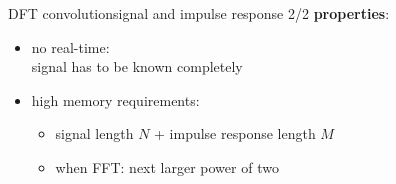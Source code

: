 	\begin{frame}{DFT convolution}{signal and impulse response 2/2}
		\textbf{properties}:
		\begin{itemize}
			\item	no real-time:\\ signal has to be known completely
			\smallskip
            \item	high memory requirements:
			\begin{itemize}
                \item   signal length $N$ + impulse response length $M$
				\item	when FFT: next larger power of two
			\end{itemize}
		\end{itemize}
	\end{frame}

